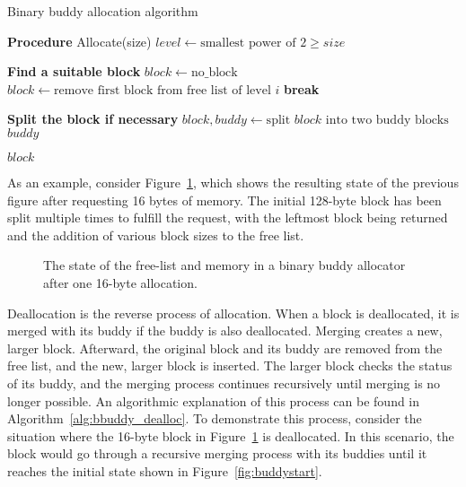 \begin{algorithm}[h]
    \caption{Binary buddy allocation algorithm}
    \label{alg:bbuddy_alloc}
    \begin{algorithmic}[1]
        \Statex \textbf{Procedure} Allocate(size)
        \State $level \gets \text{smallest power of 2} \geq size$

        \Statex \textbf{Find a suitable block}
        \State $block \gets \text{no\_block}$
        \State $block \gets \text{remove first block from free list of level } i$
        \State \textbf{break}
        \EndIf
        \EndFor

        \State \Return {}
        \EndIf

        \Statex \textbf{Split the block if necessary}
        \State $block, buddy \gets \text{split } block \text{ into two buddy blocks}$
        \State {} $buddy$ 
        \EndWhile

        \State \Return $block$
    \end{algorithmic}
\end{algorithm}

As an example, consider Figure~\ref{fig:buddysplit}, which shows the resulting state of the previous figure after requesting 16 bytes of memory. The initial 128-byte block has been split multiple times to fulfill the request, with the leftmost block being returned and the addition of various block sizes to the free list.

\begin{figure}[h]
    \centering
    
    \caption{The state of the free-list and memory in a binary buddy allocator after one 16-byte allocation.}
    \label{fig:buddysplit}
\end{figure}

\FloatBarrier

Deallocation is the reverse process of allocation. When a block is deallocated, it is merged with its buddy if the buddy is also deallocated. Merging creates a new, larger block. Afterward, the original block and its buddy are removed from the free list, and the new, larger block is inserted. The larger block checks the status of its buddy, and the merging process continues recursively until merging is no longer possible. An algorithmic explanation of this process can be found in Algorithm~\ref{alg:bbuddy_dealloc}. To demonstrate this process, consider the situation where the 16-byte block in Figure~\ref{fig:buddysplit} is deallocated. In this scenario, the block would go through a recursive merging process with its buddies until it reaches the initial state shown in Figure~\ref{fig:buddystart}.

